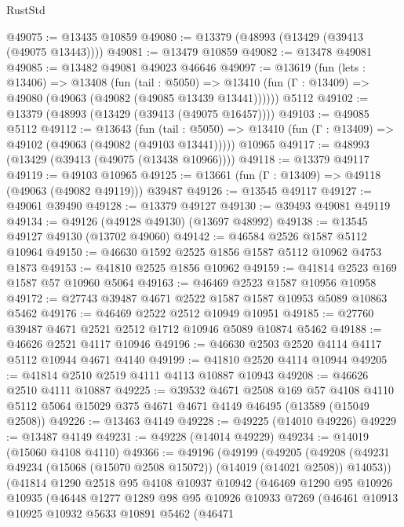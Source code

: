 \begin{lexlean}{RustStd}
\begin{coremodule}
@49075 := @13435 @10859
@49080 := @13379 (@48993 (@13429 (@39413 (@49075 @13443))))
@49081 := @13479 @10859
@49082 := @13478 @49081
@49085 := @13482 @49081 @49023 @46646
@49097 := @13619
    (fun (lets : @13406) =>
    @13408
      (fun (tail : @5050) =>
      @13410 (fun (Γ : @13409) => @49080 (@49063 (@49082 (@49085 @13439 @13441))))))
    @5112
@49102 := @13379 (@48993 (@13429 (@39413 (@49075 @16457))))
@49103 := @49085 @5112
@49112 := @13643
    (fun (tail : @5050) => @13410 (fun (Γ : @13409) => @49102 (@49063 (@49082 (@49103 @13441)))))
    @10965
@49117 := @48993 (@13429 (@39413 (@49075 (@13438 @10966))))
@49118 := @13379 @49117
@49119 := @49103 @10965
@49125 := @13661 (fun (Γ : @13409) => @49118 (@49063 (@49082 @49119))) @39487
@49126 := @13545 @49117
@49127 := @49061 @39490
@49128 := @13379 @49127
@49130 := @39493 @49081 @49119
@49134 := @49126 (@49128 @49130) (@13697 @48992)
@49138 := @13545 @49127 @49130 (@13702 @49060)
@49142 := @46584 @2526 @1587 @5112 @10964
@49150 := @46630 @1592 @2525 @1856 @1587 @5112 @10962 @4753 @1873
@49153 := @41810 @2525 @1856 @10962
@49159 := @41814 @2523 @169 @1587 @57 @10960 @5064
@49163 := @46469 @2523 @1587 @10956 @10958
@49172 := @27743 @39487 @4671 @2522 @1587 @1587 @10953 @5089 @10863 @5462
@49176 := @46469 @2522 @2512 @10949 @10951
@49185 := @27760 @39487 @4671 @2521 @2512 @1712 @10946 @5089 @10874 @5462
@49188 := @46626 @2521 @4117 @10946
@49196 := @46630 @2503 @2520 @4114 @4117 @5112 @10944 @4671 @4140
@49199 := @41810 @2520 @4114 @10944
@49205 := @41814 @2510 @2519 @4111 @4113 @10887 @10943
@49208 := @46626 @2510 @4111 @10887
@49225 := @39532
    @4671
    @2508
    @169
    @57
    @4108
    @4110
    @5112
    @5064
    @15029
    @375
    @4671
    @4671
    @4149
    @46495
    (@13589 (@15049 @2508))
@49226 := @13463 @4149
@49228 := @49225 (@14010 @49226)
@49229 := @13487 @4149
@49231 := @49228 (@14014 @49229)
@49234 := @14019 (@15060 @4108 @4110)
@49366 := @49196
    (@49199
      (@49205
        (@49208 (@49231 @49234 (@15068 (@15070 @2508 @15072)) (@14019 (@14021 @2508)) @14053))
        (@41814
          @1290
          @2518
          @95
          @4108
          @10937
          @10942
          (@46469
            @1290
            @95
            @10926
            @10935
            (@46448
              @1277
              @1289
              @98
              @95
              @10926
              @10933
              @7269
              (@46461
                @10913
                @10925
                @10932
                @5633
                @10891
                @5462
                (@46471

\end{coremodule}
\end{lexlean}
